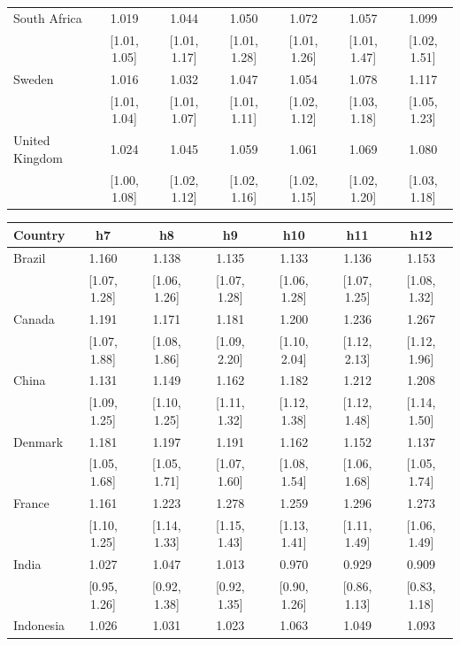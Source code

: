 \begin{table}[htbp]
{\begin{tabular*}{\textwidth}{@{\extracolsep{\fill}}lcccccc}
\addlinespace
South Africa & 1.019 & 1.044 & 1.050 & 1.072 & 1.057 & 1.099 \\
 & [1.01, 1.05] & [1.01, 1.17] & [1.01, 1.28] & [1.01, 1.26] & [1.01, 1.47] & [1.02, 1.51] \\
\addlinespace
Sweden & 1.016 & 1.032 & 1.047 & 1.054 & 1.078 & 1.117 \\
 & [1.01, 1.04] & [1.01, 1.07] & [1.01, 1.11] & [1.02, 1.12] & [1.03, 1.18] & [1.05, 1.23] \\
\addlinespace
United Kingdom & 1.024 & 1.045 & 1.059 & 1.061 & 1.069 & 1.080 \\
 & [1.00, 1.08] & [1.02, 1.12] & [1.02, 1.16] & [1.02, 1.15] & [1.02, 1.20] & [1.03, 1.18] \\
\bottomrule
\end{tabular*}

\vspace{6pt}
\begin{tabular*}{\textwidth}{@{\extracolsep{\fill}}lcccccc}
\toprule
Country & h7 & h8 & h9 & h10 & h11 & h12 \\
\midrule
Brazil & 1.160 & 1.138 & 1.135 & 1.133 & 1.136 & 1.153 \\
 & [1.07, 1.28] & [1.06, 1.26] & [1.07, 1.28] & [1.06, 1.28] & [1.07, 1.25] & [1.08, 1.32] \\
\addlinespace
Canada & 1.191 & 1.171 & 1.181 & 1.200 & 1.236 & 1.267 \\
 & [1.07, 1.88] & [1.08, 1.86] & [1.09, 2.20] & [1.10, 2.04] & [1.12, 2.13] & [1.12, 1.96] \\
\addlinespace
China & 1.131 & 1.149 & 1.162 & 1.182 & 1.212 & 1.208 \\
 & [1.09, 1.25] & [1.10, 1.25] & [1.11, 1.32] & [1.12, 1.38] & [1.12, 1.48] & [1.14, 1.50] \\
\addlinespace
Denmark & 1.181 & 1.197 & 1.191 & 1.162 & 1.152 & 1.137 \\
 & [1.05, 1.68] & [1.05, 1.71] & [1.07, 1.60] & [1.08, 1.54] & [1.06, 1.68] & [1.05, 1.74] \\
\addlinespace
France & 1.161 & 1.223 & 1.278 & 1.259 & 1.296 & 1.273 \\
 & [1.10, 1.25] & [1.14, 1.33] & [1.15, 1.43] & [1.13, 1.41] & [1.11, 1.49] & [1.06, 1.49] \\
\addlinespace
India & 1.027 & 1.047 & 1.013 & 0.970 & 0.929 & 0.909 \\
 & [0.95, 1.26] & [0.92, 1.38] & [0.92, 1.35] & [0.90, 1.26] & [0.86, 1.13] & [0.83, 1.18] \\
\addlinespace
Indonesia & 1.026 & 1.031 & 1.023 & 1.063 & 1.049 & 1.093 \\

\end{tabular*}}
\end{table}
